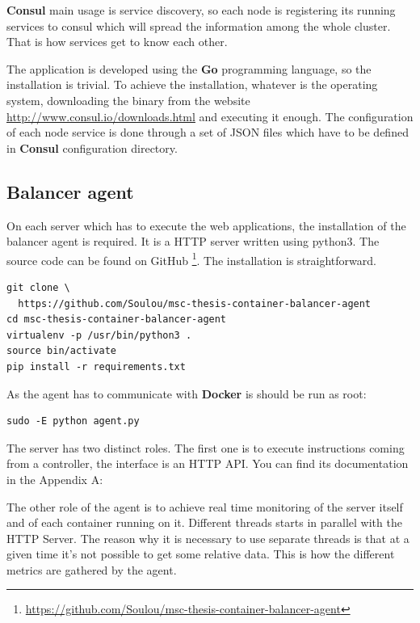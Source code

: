 \textbf{Consul} main usage is service discovery, so each node is registering its
running services to consul which will spread the information among the whole
cluster. That is how services get to know each other.

The application is developed using the \textbf{Go} programming language, so
the installation is trivial. To achieve the installation, whatever is the
operating system, downloading the binary from the website
\url{http://www.consul.io/downloads.html} and executing it enough.  The
configuration of each node service is done through a set of JSON files which
have to be defined in \textbf{Consul} configuration directory.

\subsection{Balancer agent}

On each server which has to execute the web applications, the installation
of the balancer agent is required. It is a HTTP server written using python3.
The source code can be found on GitHub
\footnote{\url{https://github.com/Soulou/msc-thesis-container-balancer-agent}}. The
installation is straightforward.

\vspace{1em}
\begin{lstlisting}
git clone \
  https://github.com/Soulou/msc-thesis-container-balancer-agent
cd msc-thesis-container-balancer-agent
virtualenv -p /usr/bin/python3 .
source bin/activate
pip install -r requirements.txt
\end{lstlisting}

As the agent has to communicate with \textbf{Docker} is should be run as
root:

\vspace{1em}
\begin{lstlisting}
sudo -E python agent.py
\end{lstlisting}

The server has two distinct roles. The first one is to execute instructions
coming from a controller, the interface is an HTTP API. You can find its
documentation in the Appendix A: ~\nameref{app:agent-api}

The other role of the agent is to achieve real time monitoring of the
server itself and of each container running on it. Different threads
starts in parallel with the HTTP Server. The reason why it is necessary
to use separate threads is that at a given time it's not possible to
get some relative data. This is how the different metrics are gathered
by the agent.

